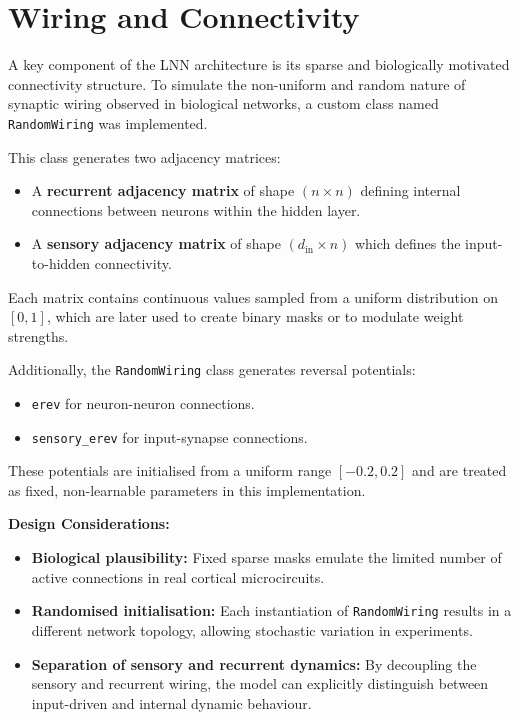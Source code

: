 \section{Wiring and Connectivity}
A key component of the LNN architecture is its sparse and biologically motivated connectivity structure. To simulate the non-uniform and random nature of synaptic wiring observed in biological networks, a custom class named \texttt{RandomWiring} was implemented.

This class generates two adjacency matrices:
\begin{itemize}
    \item A \textbf{recurrent adjacency matrix} of shape $(n \times n)$ defining internal connections between neurons within the hidden layer.
    \item A \textbf{sensory adjacency matrix} of shape $(d_{\text{in}} \times n)$ which defines the input-to-hidden connectivity.
\end{itemize}
Each matrix contains continuous values sampled from a uniform distribution on $[0, 1]$, which are later used to create binary masks or to modulate weight strengths.

Additionally, the \texttt{RandomWiring} class generates reversal potentials:
\begin{itemize}
    \item \texttt{erev} for neuron-neuron connections.
    \item \texttt{sensory\_erev} for input-synapse connections.
\end{itemize}
These potentials are initialised from a uniform range $[-0.2, 0.2]$ and are treated as fixed, non-learnable parameters in this implementation.

\vspace{1em}
\noindent \textbf{Design Considerations:}
\begin{itemize}
    \item \textbf{Biological plausibility:} Fixed sparse masks emulate the limited number of active connections in real cortical microcircuits.
    \item \textbf{Randomised initialisation:} Each instantiation of \texttt{RandomWiring} results in a different network topology, allowing stochastic variation in experiments.
    \item \textbf{Separation of sensory and recurrent dynamics:} By decoupling the sensory and recurrent wiring, the model can explicitly distinguish between input-driven and internal dynamic behaviour.
\end{itemize}

